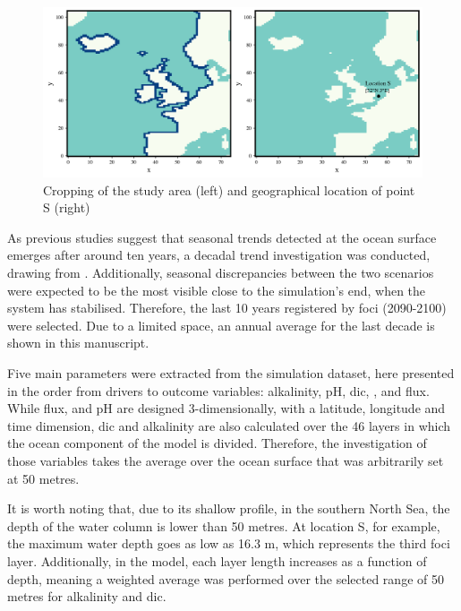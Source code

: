\begin{figure}[H]
\caption[Cropping of the study area and geographical location of point S]{Cropping of the study area (left) and geographical location of point S (right)}
\label{cropping}
\centering
\includegraphics[width=15cm]{fig/2_Methods/mesh_mask_point.png}

\end{figure}

As previous studies suggest that seasonal trends detected at the ocean surface emerges after around ten years, a decadal trend investigation was conducted, drawing from \cite{wang2023simulated}. Additionally, seasonal discrepancies between the two scenarios were expected to be the most visible close to the simulation's end, when the system has stabilised. Therefore, the last 10 years registered by \ac{foci} (2090-2100) were selected. Due to a limited space, an annual average for the last decade is shown in this manuscript. 

Five main parameters were extracted from the simulation dataset, here presented in the order from drivers to outcome variables: alkalinity, pH, \ac{dic}, , and  flux. While  flux,  and pH are designed 3-dimensionally, with a latitude, longitude and time dimension, \ac{dic} and alkalinity are also calculated over the 46 layers in which the ocean component of the model is divided. Therefore, the investigation of those variables takes the average over the ocean surface that was arbitrarily set at 50 metres. 

It is worth noting that, due to its shallow profile, in the southern North Sea, the depth of the water column is lower than 50 metres. At location S, for example, the maximum water depth goes as low as 16.3 m, which represents the third \ac{foci} layer. Additionally, in the model, each layer length increases as a function of depth, meaning a weighted average was performed over the selected range of 50 metres for alkalinity and \ac{dic}. 

